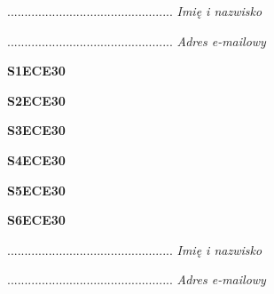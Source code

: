 \begin{turn}{90}\begin{minipage}{\linewidth} \vspace{20mm} ................................................  \textit{Imię i nazwisko}\end{minipage}\end{turn}

\begin{turn}{90}\begin{minipage}{\linewidth} \vspace{20mm} ................................................  \textit{Adres e-mailowy}\end{minipage}\end{turn}

\begin{turn}{90}\huge \textbf{S1ECE30}\end{turn}

\begin{turn}{90}\huge \textbf{S2ECE30}\end{turn}

\begin{turn}{90}\huge \textbf{S3ECE30}\end{turn}

\begin{turn}{90}\huge \textbf{S4ECE30}\end{turn}

\begin{turn}{90}\huge \textbf{S5ECE30}\end{turn}

\begin{turn}{90}\huge \textbf{S6ECE30}\end{turn}

\begin{turn}{90}\begin{minipage}{\linewidth} \vspace{20mm} ................................................  \textit{Imię i nazwisko}\end{minipage}\end{turn}

\begin{turn}{90}\begin{minipage}{\linewidth} \vspace{20mm} ................................................  \textit{Adres e-mailowy}\end{minipage}\end{turn}


